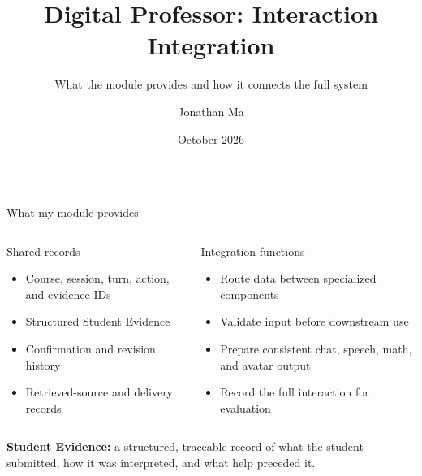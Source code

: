 \documentclass[aspectratio=169,10pt]{beamer}
\title{Digital Professor: Interaction Integration}
\subtitle{What the module provides and how it connects the full system}
\author{Jonathan Ma}
\date{October 2026}
\newcommand{\good}[1]{\textcolor{Forest}{\textbf{#1}}}
\begin{document}
\begin{frame}[plain]
  \vfill
  {\color{Forest}\LARGE\inserttitle\par}
  \vspace{.5em}
  {\color{Muted}\large\insertsubtitle\par}
  \vspace{1.5em}
  {\color{Rust}\rule{2.2cm}{2pt}}\par
  \vspace{1.2em}
  {\small\insertauthor\hfill\insertdate}
  \vfill
\end{frame}

\begin{frame}{What my module provides}
\begin{columns}[T,onlytextwidth]
\begin{block}{Shared records}
\begin{itemize}
\item Course, session, turn, action, and evidence IDs
\item Structured Student Evidence
\item Confirmation and revision history
\item Retrieved-source and delivery records
\end{itemize}
\end{block}
\begin{block}{Integration functions}
\begin{itemize}
\item Route data between specialized components
\item Validate input before downstream use
\item Prepare consistent chat, speech, math, and avatar output
\item Record the full interaction for evaluation
\end{itemize}
\end{block}
\end{columns}
\vspace{.5em}
\centering
\good{Student Evidence:} a structured, traceable record of what the student submitted, how it was interpreted, and what help preceded it.
\end{frame}
\end{document}

